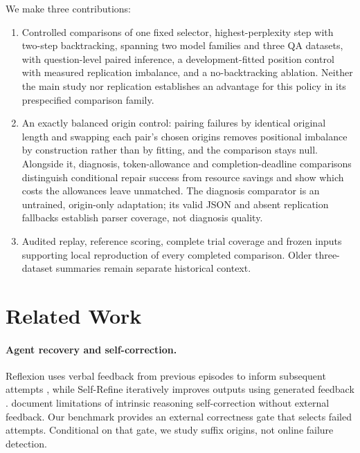 \documentclass{article}
\begin{document}
We make three contributions:
\begin{enumerate}
\item Controlled comparisons of one fixed selector, highest-perplexity step
      with two-step backtracking, spanning two model families and three QA
      datasets, with question-level paired inference, a development-fitted
      position control with measured replication imbalance, and a
      no-backtracking ablation. Neither the main
      study nor replication establishes an advantage for this policy in its
      prespecified comparison family.
\item An exactly balanced origin control: pairing failures by identical
      original length and swapping each pair's chosen origins removes
      positional imbalance by construction rather than by fitting, and the
      comparison stays null. Alongside it, diagnosis, token-allowance and
      completion-deadline comparisons distinguish conditional repair success
      from resource savings and show which costs the allowances leave
      unmatched. The diagnosis comparator is an untrained, origin-only
      adaptation; its valid JSON and absent replication fallbacks establish
      parser coverage, not diagnosis quality.
\item Audited replay, reference scoring, complete trial coverage and frozen
      inputs supporting local reproduction of every completed comparison.
      Older three-dataset summaries remain separate historical context.
\end{enumerate}

\section{Related Work}
\paragraph{Agent recovery and self-correction.}
Reflexion uses verbal feedback from previous episodes to inform subsequent
attempts \citep{shinn2023reflexion}, while Self-Refine iteratively improves
outputs using generated feedback \citep{madaan2023selfrefine}.
\citet{huang2024large} document limitations of intrinsic reasoning
self-correction without external feedback. Our benchmark provides an
external correctness gate that selects failed attempts. Conditional on
that gate, we study suffix origins, not online failure detection.
\end{document}
